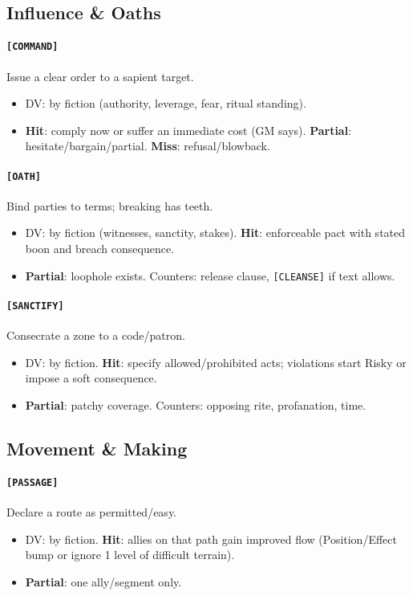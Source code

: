 \documentclass[11pt]{article}
\begin{document}
\subsection*{Influence \& Oaths}
\paragraph{\texttt{[COMMAND]}} Issue a clear order to a sapient target.
\begin{itemize}
  \item DV: by fiction (authority, leverage, fear, ritual standing).
  \item \textbf{Hit}: comply now or suffer an immediate cost (GM says). \textbf{Partial}: hesitate/bargain/partial. \textbf{Miss}: refusal/blowback.
\end{itemize}

\paragraph{\texttt{[OATH]}} Bind parties to terms; breaking has teeth.
\begin{itemize}
  \item DV: by fiction (witnesses, sanctity, stakes). \textbf{Hit}: enforceable pact with stated boon and breach consequence.
  \item \textbf{Partial}: loophole exists. Counters: release clause, \texttt{[CLEANSE]} if text allows.
\end{itemize}

\paragraph{\texttt{[SANCTIFY]}} Consecrate a zone to a code/patron.
\begin{itemize}
  \item DV: by fiction. \textbf{Hit}: specify allowed/prohibited acts; violations start Risky or impose a soft consequence.
  \item \textbf{Partial}: patchy coverage. Counters: opposing rite, profanation, time.
\end{itemize}

\subsection*{Movement \& Making}
\paragraph{\texttt{[PASSAGE]}} Declare a route as permitted/easy.
\begin{itemize}
  \item DV: by fiction. \textbf{Hit}: allies on that path gain improved flow (Position/Effect bump or ignore 1 level of difficult terrain).
  \item \textbf{Partial}: one ally/segment only.
\end{itemize}
\end{document}
